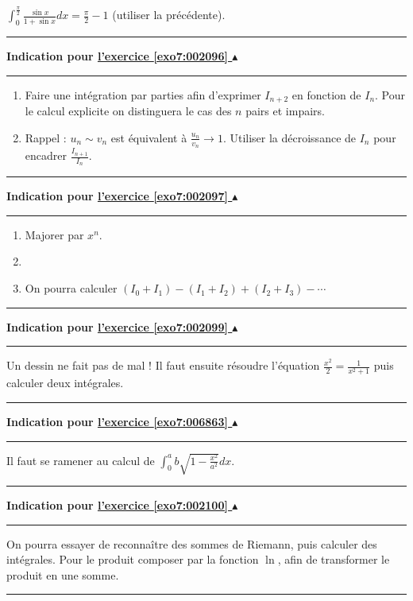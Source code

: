 \documentclass[11pt,a4paper]{article}
\newcounter{exo}
\newcommand{\indication}[1]{\hypertarget{ind7:#1}{}\label{ind7:#1}{\bf Indication pour \hyperlink{exo7:#1}{l'exercice \ref{exo7:#1} $\blacktriangle$}}\vspace{1mm}\hrule\vspace{1mm}}
\newcommand{\finindication}{\vspace{1mm}\hrule\vspace*{7mm}}
\begin{document}
$\int_0^{\frac \pi 2}\frac{\sin x}{1+\sin x}dx=\frac \pi 2-1$ (utiliser la précédente).
\finindication
\indication{002096}
  \begin{enumerate}
  \item Faire une intégration par parties afin d'exprimer $I_{n+2}$ en fonction de $I_n$. 
Pour le calcul explicite on distinguera le cas des $n$ pairs et impairs.
  \item Rappel : $u_n\sim v_n$ est équivalent à $\frac{u_n}{v_n} \to 1$. 
Utiliser la décroissance de $I_n$ pour encadrer $\frac{I_{n+1}}{I_n}$.
  \end{enumerate}
\finindication
\indication{002097}
  \begin{enumerate}
  \item Majorer par $x^n$.
  \item
  \item On pourra calculer $(I_0+I_1)-(I_1+I_2)+(I_2+I_3)- \cdots$
  \end{enumerate}
\finindication
\indication{002099}
Un dessin ne fait pas de mal !
Il faut ensuite résoudre l'équation $\frac{x^2}2=\frac 1{x^2+1}$
puis calculer deux intégrales.
\finindication
\indication{006863}
Il faut se ramener au calcul de $\displaystyle \int_0^a b\sqrt{1-\frac{x^2}{a^2}} dx$.
\finindication
\indication{002100}
On pourra essayer de reconnaître des sommes de Riemann, puis calculer des intégrales. 
Pour le produit composer par la fonction $\ln$, afin de transformer le produit en une somme.
\finindication


\newpage
\end{document}
